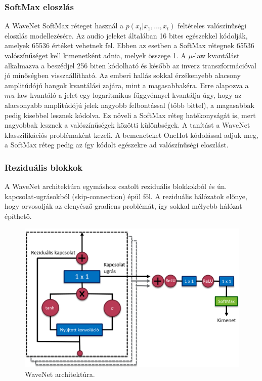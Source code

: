 \subsubsection{SoftMax eloszlás}
A WaveNet SoftMax réteget használ a $p(x_t|x_1,\dots,x_t)$ feltételes valószínűségi eloszlás modellezésére.
Az audio jeleket általában 16 bites egészekkel kódolják, amelyek 65536 értéket vehetnek fel. Ebben az esetben a SoftMax rétegnek 65536 valószínűséget kell kimenetként adnia, melyek összege 1. A $\mu$-law kvantálást alkalmazva a beszédjel 256 biten kódolható és később az inverz transzformációval jó minőségben visszaállítható.
\newline
\newline
Az emberi hallás sokkal érzékenyebb alacsony amplitúdójú hangok kvantálási zajára, mint a magasabbakéra. Erre alapozva a $mu$-law kvantáló a jelet egy logaritmikus függvénnyel kvantálja úgy, hogy az alacsonyabb amplitúdójú jelek nagyobb felbontással (több bittel), a magasabbak pedig kisebbel lesznek kódolva. Ez növeli a SoftMax réteg hatékonyságát is, mert nagyobbak lesznek a valószínűségek közötti különbségek.
\newline
\newline
A tanítást a WaveNet klasszifikációs problémaként kezeli. A bemeneteket OneHot kódolással adjuk meg, a SoftMax réteg pedig az így kódolt egészekre ad valószínűségi eloszlást.

\subsubsection{Reziduális blokkok}

A WaveNet architektúra egymáshoz csatolt reziduális blokkokból és ún. kapcsolat-ugrásokból (skip-connection) épül föl. A reziduális hálózatok előnye, hogy orvosolják az elenyésző gradiens problémát, így sokkal mélyebb hálózat építhető.

\begin{figure}[!ht]
	\centering
	\includegraphics[width=150mm, keepaspectratio]{figures/wavenet_arch.png}
	\caption{WaveNet architektúra.}
	\label{fig:wavenet_arch}
\end{figure}

